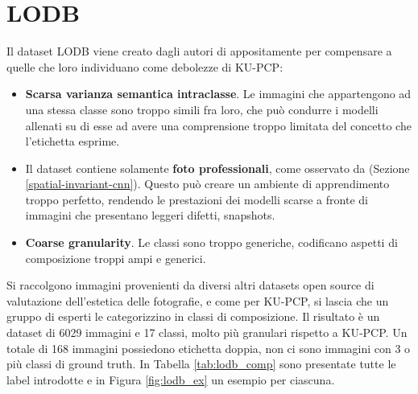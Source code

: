 \section{LODB}
\label{lodb}
Il dataset LODB viene creato dagli autori di \cite{graph} appositamente per compensare a quelle che loro individuano come debolezze di KU-PCP:
\begin{itemize}
    \item \textbf{Scarsa varianza semantica intraclasse}. Le immagini che appartengono ad una stessa classe sono troppo simili fra loro, che può condurre i modelli allenati su di esse ad avere una comprensione troppo limitata del concetto che l'etichetta esprime.
    \item Il dataset contiene solamente \textbf{foto professionali}, come osservato da \cite{spatial_invariant_cnn} (Sezione \ref{spatial-invariant-cnn}). Questo può creare un ambiente di apprendimento troppo perfetto, rendendo le prestazioni dei modelli scarse a fronte di immagini che presentano leggeri difetti, snapshots.
    \item \textbf{Coarse granularity}. Le classi sono troppo generiche, codificano aspetti di composizione troppi ampi e generici.
\end{itemize}

Si raccolgono immagini provenienti da diversi altri datasets open source di valutazione dell'estetica delle fotografie, e come per KU-PCP, si lascia che un gruppo di esperti le categorizzino in classi di composizione. Il risultato è un dataset di 6029 immagini e 17 classi, molto più granulari rispetto a KU-PCP. Un totale di 168 immagini possiedono etichetta doppia, non ci sono immagini con 3 o più classi di ground truth. In Tabella \ref{tab:lodb_comp} sono presentate tutte le label introdotte e in Figura \ref{fig:lodb_ex} un esempio per ciascuna.

